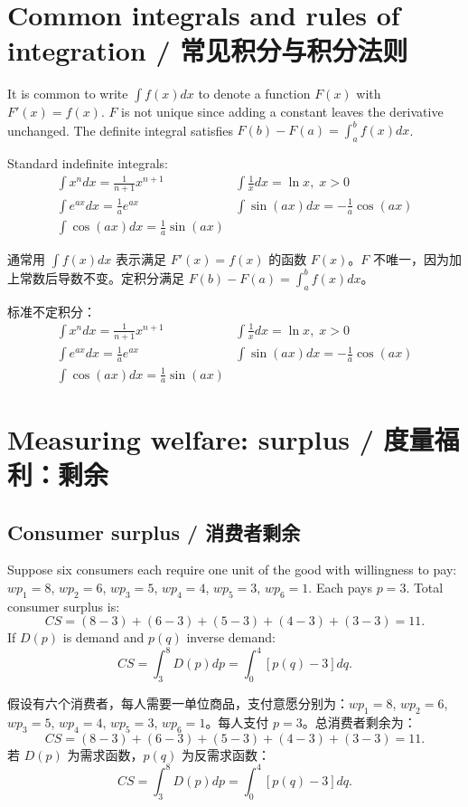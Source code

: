 \section{Common integrals and rules of integration / 常见积分与积分法则}

\begin{original}
It is common to write $\int f(x)dx$ to denote a function $F(x)$ with $F'(x) = f(x)$. $F$ is not unique since adding a constant leaves the derivative unchanged. The definite integral satisfies $F(b) - F(a) = \int_a^b f(x)dx$.

Standard indefinite integrals:
\[
\begin{array}{ll}
\int x^n dx = \frac{1}{n+1}x^{n+1} & \int \frac{1}{x} dx = \ln x,\; x > 0 \\[4pt]
\int e^{ax} dx = \frac{1}{a} e^{ax} & \int \sin(ax) dx = -\frac{1}{a}\cos(ax) \\[4pt]
\int \cos(ax) dx = \frac{1}{a}\sin(ax) &
\end{array}
\]
\end{original}
\begin{translation}
通常用 $\int f(x)dx$ 表示满足 $F'(x) = f(x)$ 的函数 $F(x)$。$F$ 不唯一，因为加上常数后导数不变。定积分满足 $F(b) - F(a) = \int_a^b f(x)dx$。

标准不定积分：
\[
\begin{array}{ll}
\int x^n dx = \frac{1}{n+1}x^{n+1} & \int \frac{1}{x} dx = \ln x,\; x > 0 \\[4pt]
\int e^{ax} dx = \frac{1}{a} e^{ax} & \int \sin(ax) dx = -\frac{1}{a}\cos(ax) \\[4pt]
\int \cos(ax) dx = \frac{1}{a}\sin(ax) &
\end{array}
\]
\end{translation}

\section{Measuring welfare: surplus / 度量福利：剩余}

\subsection{Consumer surplus / 消费者剩余}

\begin{original}
Suppose six consumers each require one unit of the good with willingness to pay: $wp_1 = 8$, $wp_2 = 6$, $wp_3 = 5$, $wp_4 = 4$, $wp_5 = 3$, $wp_6 = 1$. Each pays $p = 3$. Total consumer surplus is:
\[
CS = (8-3) + (6-3) + (5-3) + (4-3) + (3-3) = 11.
\]
If $D(p)$ is demand and $p(q)$ inverse demand:
\[
CS = \int_3^8 D(p)dp = \int_0^4 [p(q) - 3]dq.
\]
\end{original}
\begin{translation}
假设有六个消费者，每人需要一单位商品，支付意愿分别为：$wp_1 = 8$, $wp_2 = 6$, $wp_3 = 5$, $wp_4 = 4$, $wp_5 = 3$, $wp_6 = 1$。每人支付 $p = 3$。总消费者剩余为：
\[
CS = (8-3) + (6-3) + (5-3) + (4-3) + (3-3) = 11.
\]
若 $D(p)$ 为需求函数，$p(q)$ 为反需求函数：
\[
CS = \int_3^8 D(p)dp = \int_0^4 [p(q) - 3]dq.
\]
\end{translation}

